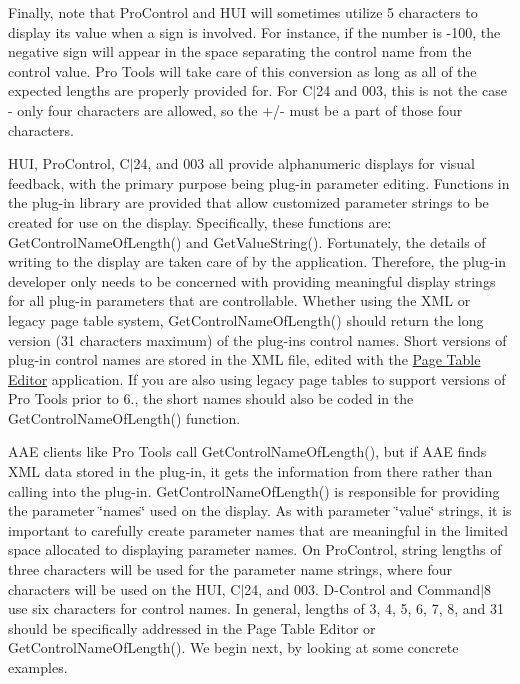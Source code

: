 Finally, note that Pro\+Control and H\+U\+I will sometimes utilize 5 characters to display its value when a sign is involved. For instance, if the number is -\/100, the negative sign will appear in the space separating the control name from the control value. Pro Tools will take care of this conversion as long as all of the expected lengths are properly provided for. For C$\vert$24 and 003, this is not the case -\/ only four characters are allowed, so the +/-\/ must be a part of those four characters.

H\+U\+I, Pro\+Control, C$\vert$24, and 003 all provide alphanumeric displays for visual feedback, with the primary purpose being plug-\/in parameter editing. Functions in the plug-\/in library are provided that allow customized parameter strings to be created for use on the display. Specifically, these functions are\+: Get\+Control\+Name\+Of\+Length() and Get\+Value\+String(). Fortunately, the details of writing to the display are taken care of by the application. Therefore, the plug-\/in developer only needs to be concerned with providing meaningful display strings for all plug-\/in parameters that are controllable. Whether using the X\+M\+L or legacy page table system, Get\+Control\+Name\+Of\+Length() should return the long version (31 characters maximum) of the plug-\/in\textquotesingle{}s control names. Short versions of plug-\/in control names are stored in the X\+M\+L file, edited with the \hyperlink{a00363_subsection_creating_page_tables_in_pete}{Page Table Editor} application. If you are also using legacy page tables to support versions of Pro Tools prior to 6., the short names should also be coded in the Get\+Control\+Name\+Of\+Length() function.

A\+A\+E clients like Pro Tools call Get\+Control\+Name\+Of\+Length(), but if A\+A\+E finds X\+M\+L data stored in the plug-\/in, it gets the information from there rather than calling into the plug-\/in. Get\+Control\+Name\+Of\+Length() is responsible for providing the parameter \char`\"{}names\char`\"{} used on the display. As with parameter \char`\"{}value\char`\"{} strings, it is important to carefully create parameter names that are meaningful in the limited space allocated to displaying parameter names. On Pro\+Control, string lengths of three characters will be used for the parameter name strings, where four characters will be used on the H\+U\+I, C$\vert$24, and 003. D-\/\+Control and Command$\vert$8 use six characters for control names. In general, lengths of 3, 4, 5, 6, 7, 8, and 31 should be specifically addressed in the Page Table Editor or Get\+Control\+Name\+Of\+Length(). We begin next, by looking at some concrete examples.

